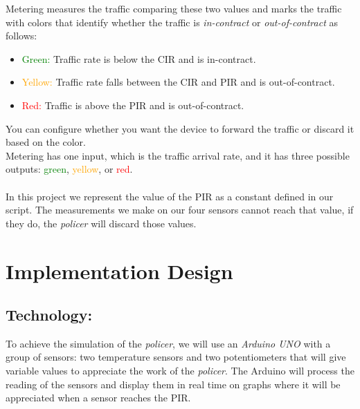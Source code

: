 \documentclass[conference]{IEEEtran}
\begin{document}
Metering measures the traffic comparing these two values and marks the traffic with colors that identify whether the traffic is \textit{in-contract} or \textit{out-of-contract} as follows:
\begin{itemize}
  \item \textcolor{green}{Green:} Traffic rate is below the CIR and is in-contract.
  \item \textcolor{orange}{Yellow:} Traffic rate falls between the CIR and PIR and is out-of-contract.
  \item \textcolor{red}{Red:} Traffic is above the PIR and is out-of-contract.
\end{itemize}
You can configure whether you want the device to forward the traffic or discard it based on the color.\\
Metering has one input, which is the traffic arrival rate, and it has three possible outputs: \textcolor{green}{green}, \textcolor{orange}{yellow}, or \textcolor{red}{red}.\\ \\
In this project we represent the value of the PIR as a constant defined in our script. The measurements we make on our four sensors cannot reach that value, if they do, the \textit{policer} will discard those values.

\section{Implementation Design}\label{sec:imp}
\subsection{\textbf{ Technology:}}
To achieve the simulation of the \textit{policer}, we will use an \textit{Arduino UNO} with a group of sensors: two temperature sensors and two potentiometers that will give variable values to appreciate the work of the \textit{policer}. The Arduino will process the reading of the sensors and display them in real time on graphs where it will be appreciated when a sensor reaches the PIR.
\end{document}
